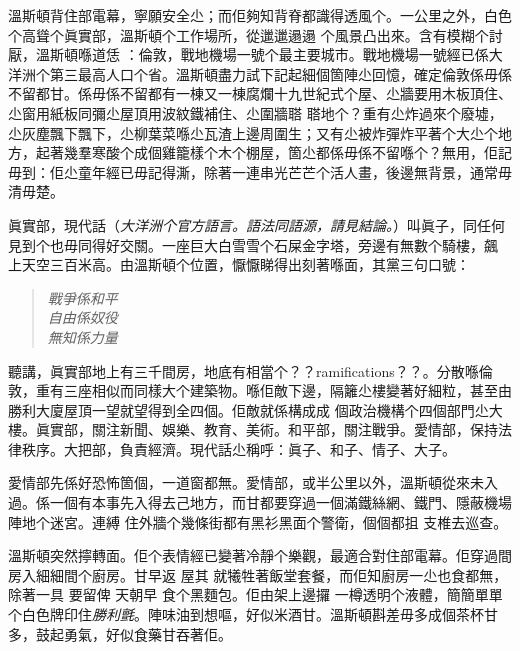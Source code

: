 溫斯頓背住部電幕，寧願安全尐；而佢夠知背脊都識得透風个。一公里之外，白色个高聳个眞實部，溫斯頓个工作場所，從邋邋遢遢
个風景凸出來。含有模糊个討厭，溫斯頓喺道恁
：倫敦，戰地機場一號个最主要城市。戰地機場一號經已係大洋洲个第三最高人口个省。溫斯頓盡力試下記起細個箇陣尐回憶，確定倫敦係毋係不留都甘。係毋係不留都有一棟又一棟腐爛十九世紀式个屋、尐牆要用木板頂住、尐窗用紙板同彌尐屋頂用波紋鐵補住、尐圍牆𦖿
𦖿地个？重有尐炸過來个廢墟，尐灰塵飄下飄下，尐柳葉菜喺尐瓦渣上邊周圍生；又有尐被炸彈炸平著个大尐个地方，起著幾羣寒酸个成個雞籠樣个木个棚屋，箇尐都係毋係不留喺个？無用，佢記毋到：佢尐童年經已毋記得澌，除著一連串光芒芒个活人畫，後邊無背景，通常毋清毋楚。

眞實部，現代話（\emph{大洋洲个官方語言。語法同語源，請見結論。}）叫眞子，同任何見到个也毋同得好交關。一座巨大白雪雪个石屎金字塔，旁邊有無數个騎樓，飆
上天空三百米高。由溫斯頓个位置，懨懨睇得出刻著喺面，其黨三句口號：
\begin{quote}\emph{
戰爭係和平\\
自由係奴役\\
無知係力量
}\end{quote}
聽講，眞實部地上有三千間房，地底有相當个？？ramifications？？。分散喺倫敦，重有三座相似而同樣大个建築物。喺佢敵下邊，隔籬尐樓變著好細粒，甚至由勝利大廈屋頂一望就望得到全四個。佢敵就係構成成
個政治機構个四個部門尐大樓。眞實部，關注新聞、娛樂、教育、美術。和平部，關注戰爭。愛情部，保持法律秩序。大把部，負責經濟。現代話尐稱呼：眞子、和子、情子、大子。

愛情部先係好恐怖箇個，一道窗都無。愛情部，或半公里以外，溫斯頓從來未入過。係一個有本事先入得去己地方，而甘都要穿過一個滿鐵絲網、鐵門、隱蔽機場陣地个迷宮。連縛
住外牆个幾條街都有黑衫黑面个警衛，個個都抯
支椎去巡查。

溫斯頓突然擰轉面。佢个表情經已變著冷靜个樂觀，最適合對住部電幕。佢穿過間房入細細間个廚房。甘早返
屋其
就犧牲著飯堂套餐，而佢知廚房一尐也食都無，除著一具
要留俾
天朝早
食个黑麵包。佢由架上邊攞
一樽透明个液體，簡簡單單个白色牌印住\emph{勝利氈}。陣味油到想嘔，好似米酒甘。溫斯頓斟差毋多成個茶杯甘多，鼓起勇氣，好似食藥甘吞著佢。

